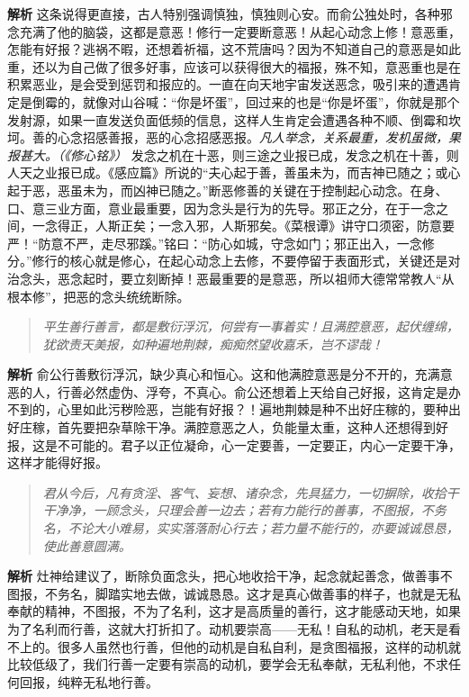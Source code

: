 \textbf{解析} 这条说得更直接，古人特别强调慎独，慎独则心安。而俞公独处时，各种邪念充满了他的脑袋，这都是意恶！修行一定要断意恶！从起心动念上修！意恶重，怎能有好报？逃祸不暇，还想着祈福，这不荒唐吗？因为不知道自己的意恶是如此重，还以为自己做了很多好事，应该可以获得很大的福报，殊不知，意恶重也是在积累恶业，是会受到惩罚和报应的。一直在向天地宇宙发送恶念，吸引来的遭遇肯定是倒霉的，就像对山谷喊：“你是坏蛋”，回过来的也是“你是坏蛋”，你就是那个发射源，如果一直发送负面低频的信息，这样人生肯定会遭遇各种不顺、倒霉和坎坷。善的心念招感善报，恶的心念招感恶报。\textit{凡人举念，关系最重，发机虽微，果报甚大。（《修心铭》）} 发念之机在十恶，则三途之业报已成，发念之机在十善，则人天之业报已成。《感应篇》所说的“夫心起于善，善虽未为，而吉神已随之；或心起于恶，恶虽未为，而凶神已随之。”断恶修善的关键在于控制起心动念。在身、口、意三业方面，意业最重要，因为念头是行为的先导。邪正之分，在于一念之间，一念得正，人斯正矣；一念入邪，人斯邪矣。《菜根谭》讲守口须密，防意要严！“防意不严，走尽邪蹊。”铭曰：“防心如城，守念如门；邪正出入，一念修分。”修行的核心就是修心，在起心动念上去修，不要停留于表面形式，关键还是对治念头，恶念起时，要立刻断掉！恶最重要的是意恶，所以祖师大德常常教人“从根本修”，把恶的念头统统断除。

\begin{quote}\it
    平生善行善言，都是敷衍浮沉，何尝有一事着实！且满腔意恶，起伏缠绵，犹欲责天美报，如种遍地荆棘，痴痴然望收嘉禾，岂不谬哉！
\end{quote}

\textbf{解析} 俞公行善敷衍浮沉，缺少真心和恒心。这和他满腔意恶是分不开的，充满意恶的人，行善必然虚伪、浮夸，不真心。俞公还想着上天给自己好报，这肯定是办不到的，心里如此污秽险恶，岂能有好报？！遍地荆棘是种不出好庄稼的，要种出好庄稼，首先要把杂草除干净。满腔意恶之人，负能量太重，这种人还想得到好报，这是不可能的。君子以正位凝命，心一定要善，一定要正，内心一定要干净，这样才能得好报。

\begin{quote}\it
    君从今后，凡有贪淫、客气、妄想、诸杂念，先具猛力，一切摒除，收拾干干净净，一顾念头，只理会善一边去；若有力能行的善事，不图报，不务名，不论大小难易，实实落落耐心行去；若力量不能行的，亦要诚诚恳恳，使此善意圆满。
\end{quote}

\textbf{解析} 灶神给建议了，断除负面念头，把心地收拾干净，起念就起善念，做善事不图报，不务名，脚踏实地去做，诚诚恳恳。这才是真心做善事的样子，也就是无私奉献的精神，不图报，不为了名利，这才是高质量的善行，这才能感动天地，如果为了名利而行善，这就大打折扣了。动机要崇高——无私！自私的动机，老天是看不上的。很多人虽然也行善，但他的动机是自私自利，是贪图福报，这样的动机就比较低级了，我们行善一定要有崇高的动机，要学会无私奉献，无私利他，不求任何回报，纯粹无私地行善。


